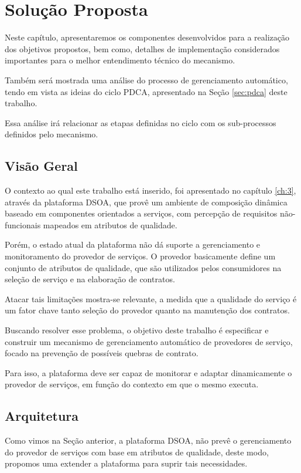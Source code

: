 \chapter{Solução Proposta}
\label{ch:4}

Neste capítulo, apresentaremos os componentes desenvolvidos para a realização dos objetivos propostos, bem como, detalhes de implementação considerados importantes para o melhor entendimento técnico do mecanismo. 

Também será mostrada uma análise do processo de gerenciamento automático, tendo em vista as ideias do ciclo PDCA, apresentado na Seção \ref{sec:pdca} deste trabalho. 

Essa análise irá relacionar as etapas definidas no ciclo com os sub-processos definidos pelo mecanismo.

\section{Visão Geral}
O contexto ao qual este trabalho está inserido, foi apresentado no capítulo \ref{ch:3}, através da plataforma DSOA, que provê um ambiente de composição dinâmica baseado em componentes orientados a serviços, com percepção de requisitos não-funcionais mapeados em atributos de qualidade. 

Porém, o estado atual da plataforma não dá suporte a gerenciamento e monitoramento do provedor de serviços. O provedor basicamente define um conjunto de atributos de qualidade, que são utilizados pelos consumidores na seleção de serviço e na elaboração de contratos.

Atacar tais limitações mostra-se relevante, a medida que a qualidade do serviço é um fator chave tanto seleção do provedor quanto na manutenção dos contratos.

Buscando resolver esse problema, o objetivo deste trabalho é especificar e construir um mecanismo de gerenciamento automático de provedores de serviço, focado na prevenção de possíveis quebras de contrato. 

Para isso, a plataforma deve ser capaz de monitorar e adaptar dinamicamente o provedor de serviços, em função do contexto em que o mesmo executa.


\section{Arquitetura}
\label{sec:arch_prop}

Como vimos na Seção anterior, a plataforma DSOA, não prevê o gerenciamento do provedor de serviços com base em atributos de qualidade, deste modo, propomos uma extender a plataforma para suprir tais necessidades.

